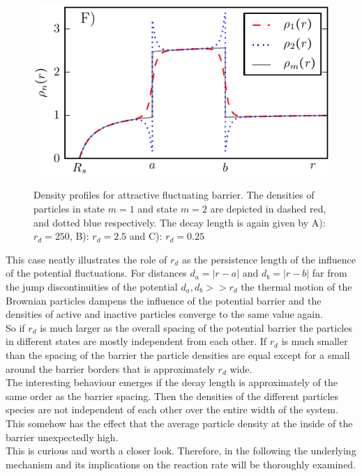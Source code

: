 \begin{minipage}[t]{0.5 \textwidth}
    \begin{figure}[H]
        \includegraphics[width = 1 \textwidth]{plots/d6.pdf}
    \end{figure}
\end{minipage}\hspace{0.02\textwidth}\begin{minipage}[t]{0.48 \textwidth}
    \begin{figure}[H]
        \caption{Density profiles for attractive fluctuating barrier. The densities of particles in state $m=1$ and state $m=2$ are depicted in dashed red, and dotted blue respectively. The decay length is again given by A): $r_d = 250$, B): $r_d=2.5$ and C): $r_d=0.25$\label{att_symm_dens_profile}}
    \end{figure}
\end{minipage} 
\newpage
This case neatly illustrates the role of $r_d$ as the persistence length of the influence of the potential fluctuations. For distances $d_a = |r - a|$ and $d_b = |r - b|$ far from the jump discontinuities of the potential $d_a, d_b >> r_d$ the thermal motion of the Brownian particles dampens the influence of the potential barrier and the densities of active and inactive particles converge to the same value again.\\
So if $r_d$ is much larger as the overall spacing of the potential barrier the particles in different states are mostly independent from each other. If $r_d$ is much smaller than the spacing of the barrier the particle densities are equal except for a small around the barrier borders that is approximately $r_d$ wide.\\
The interesting behaviour emerges if the decay length is approximately of the same order as the barrier spacing. Then the densities of the different particles species are not independent of each other over the entire width of the system. This somehow has the effect that the average particle density at the inside of the barrier unexpectedly high. \\
This is curious and worth a closer look. Therefore, in the following the underlying mechanism and its implications on the reaction rate will be thoroughly examined. \\ 

